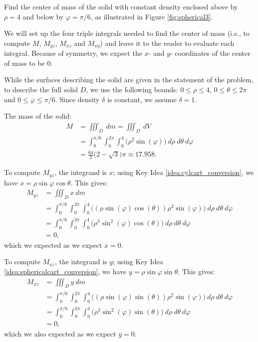 {Find the center of mass of the solid with constant density enclosed above by $\rho=4$ and below by $\varphi = \pi/6$, as illustrated in Figure \ref{fig:spherical3}.
}
{We will set up the four triple integrals needed to find the center of mass (i.e., to compute $M$, $M_{yz}$, $M_{xz}$ and $M_{xy}$) and leave it to the reader to evaluate each integral. Because of symmetry, we expect the $x$- and $y$- coordinates of the center of mass to be 0.

While the surfaces describing the solid are given in the statement of the problem, to describe the full solid $D$, we use the following bounds: $0 \leq \rho \leq 4$, $0 \leq \theta \leq 2\pi$ and $0 \leq \varphi \leq \pi/6$. Since density $\delta$ is constant, we assume $\delta =1$.

The mass of the solid:
\begin{align*}
M &= \iiint_D\ dm = \iiint_D\ dV\\
	&= \int_0^{\pi/6}\int_0^{2\pi}\int_0^4\big(\rho^2\sin(\varphi)\big)\ d\rho\ d\theta\ d\varphi\\
	&= \frac{64}3\big(2-\sqrt{3}\big)\pi \approx 17.958.
\end{align*}

To compute $M_{yz}$, the integrand is $x$; using Key Idea \ref{idea:cylcart_conversion}, we have $x = \rho\sin\varphi\cos\theta$. This gives:
\begin{align*}
M_{yz} &= \iiint_D x\ dm \\
	&= \int_0^{\pi/6}\int_0^{2\pi}\int_0^4 \big((\rho\sin(\varphi)\cos(\theta))\rho^2\sin(\varphi)\big) \ d\rho\ d\theta\ d\varphi\\
	&= \int_0^{\pi/6}\int_0^{2\pi}\int_0^4 \big(\rho^3\sin^2(\varphi)\cos(\theta)\big) \ d\rho\ d\theta\ d\varphi\\
	&=0,
\end{align*}
which we expected as we expect $\overline{x} = 0$.

To compute $M_{xz}$, the integrand is $y$; using Key Idea \ref{idea:sphericalcart_conversion}, we have $y = \rho\sin\varphi\sin\theta$. This gives:
\begin{align*}
M_{xz} &= \iiint_D y\ dm \\
	&= \int_0^{\pi/6}\int_0^{2\pi}\int_0^4 \big((\rho\sin(\varphi)\sin(\theta))\rho^2\sin(\varphi)\big) \ d\rho\ d\theta\ d\varphi\\
	&= \int_0^{\pi/6}\int_0^{2\pi}\int_0^4 \big(\rho^3\sin^2(\varphi)\sin(\theta)\big) \ d\rho\ d\theta\ d\varphi\\
	&=0,
\end{align*}
which we also expected as we expect $\overline{y} = 0$.

}
